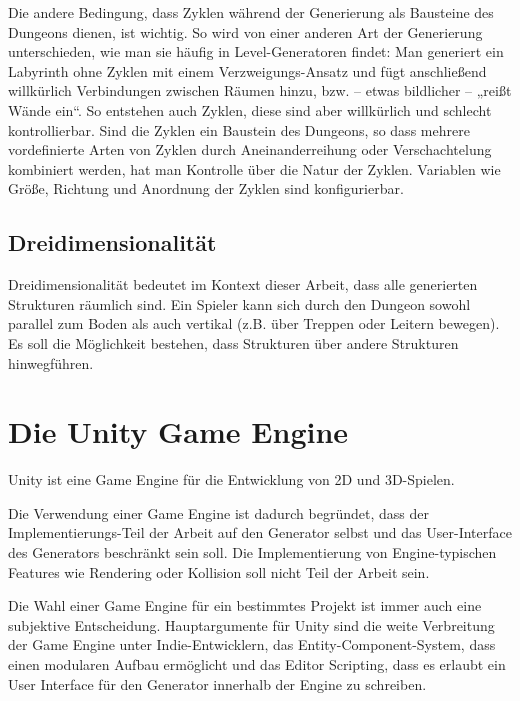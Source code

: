 Die andere Bedingung, dass Zyklen während der Generierung als Bausteine des Dungeons dienen, ist wichtig. So wird von einer anderen Art der Generierung unterschieden, wie man sie häufig in Level-Generatoren findet: Man generiert ein Labyrinth ohne Zyklen mit einem Verzweigungs-Ansatz und fügt anschließend willkürlich Verbindungen zwischen Räumen hinzu, bzw. -- etwas bildlicher -- „reißt Wände ein“. So entstehen auch Zyklen, diese sind aber willkürlich und schlecht kontrollierbar. Sind die Zyklen ein Baustein des Dungeons, so dass mehrere vordefinierte Arten von Zyklen durch Aneinanderreihung oder Verschachtelung kombiniert werden, hat man Kontrolle über die Natur der Zyklen. Variablen wie Größe, Richtung und Anordnung der Zyklen sind konfigurierbar.

\subsection{Dreidimensionalität}

Dreidimensionalität bedeutet im Kontext dieser Arbeit, dass alle generierten Strukturen räumlich sind. Ein Spieler kann sich durch den Dungeon sowohl parallel zum Boden als auch vertikal (z.B. über Treppen oder Leitern bewegen). Es soll die Möglichkeit bestehen, dass Strukturen über andere Strukturen hinwegführen.


\section{Die Unity Game Engine}

Unity ist eine Game Engine für die Entwicklung von 2D und 3D-Spielen. 

Die Verwendung einer Game Engine ist dadurch begründet, dass der Implementierungs-Teil der Arbeit auf den Generator selbst und das User-Interface des Generators beschränkt sein soll. Die Implementierung von Engine-typischen Features wie Rendering oder Kollision soll nicht Teil der Arbeit sein.

Die Wahl einer Game Engine für ein bestimmtes Projekt ist immer auch eine subjektive Entscheidung. Hauptargumente für Unity sind die weite Verbreitung der Game Engine unter Indie-Entwicklern, das Entity-Component-System, dass einen modularen Aufbau ermöglicht und das Editor Scripting, dass es erlaubt ein User Interface für den Generator innerhalb der Engine zu schreiben. 

